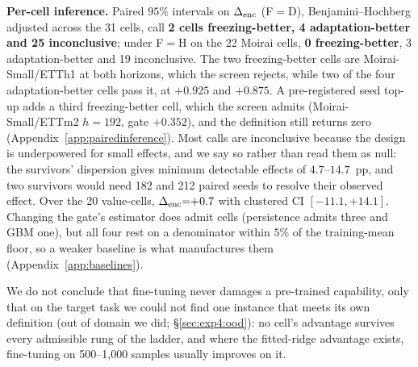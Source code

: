 \textbf{Per-cell inference.}  Paired $95\%$ intervals on $\Delta_\text{enc}$ (F${=}$D),
Benjamini--Hochberg adjusted across the 31 cells, call \textbf{2 cells
freezing-better, 4 adaptation-better and 25 inconclusive}; under F${=}$H on
the 22 Moirai cells, \textbf{0 freezing-better}, 3 adaptation-better and 19
inconclusive.  The two freezing-better cells are Moirai-Small/ETTh1 at
both horizons, which the screen rejects, while two of the four adaptation-better
cells pass it, at $+0.925$ and $+0.875$.  A pre-registered seed top-up adds a third
freezing-better cell, which the screen admits (Moirai-Small/ETTm2 $h{=}192$,
gate $+0.352$), and the definition still returns zero
(Appendix~\ref{app:pairedinference}).  Most calls are inconclusive because the
design is underpowered for small effects, and we say so rather than read them as
null: the survivors' dispersion gives minimum detectable effects of
$4.7$--$14.7$~pp, and two survivors would need 182 and 212 paired seeds to
resolve their observed effect.  Over the 20 value-cells, $\Delta_\text{enc}{=}{+}0.7$ with
clustered CI $[-11.1,{+}14.1]$.  Changing the gate's estimator does admit cells
(persistence admits three and GBM one), but all four rest on a denominator within
$5\%$ of the training-mean floor, so a weaker baseline is what manufactures them
(Appendix~\ref{app:baselines}).

We do not conclude that fine-tuning never damages a pre-trained capability, only
that on the target task we could not find one instance that meets its own
definition (out of domain we did; \S\ref{sec:exp4:ood}): no cell's advantage survives every admissible rung of the ladder, and
where the fitted-ridge advantage exists, fine-tuning on 500--1{,}000 samples
usually improves on it.

